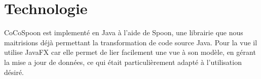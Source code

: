 \section{Technologie}
CoCoSpoon est implementé en Java à l'aide de Spoon, une librairie que nous maitrisions déjà permettant la transformation de code source Java. Pour la vue il utilise JavaFX car elle permet de lier facilement une vue à son modèle, en gérant la mise a jour de données, ce qui était particulièrement adapté à l'utilisation désiré. 